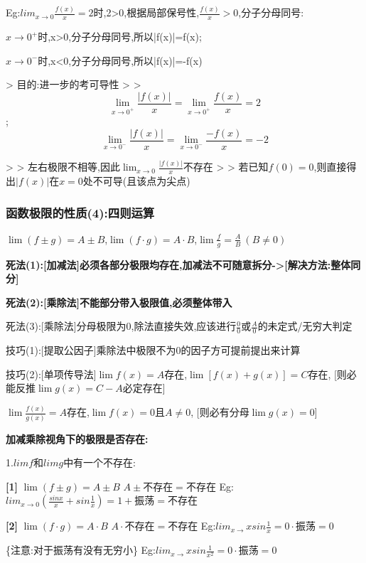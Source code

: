 \documentclass[11pt,a4paper,UTF8]{ctexart}
\begin{document}
\begin{solbox}[{分步推导与答题规范}]
  Eg:$lim_{x\rightarrow 0}\frac{f(x)}{x}=2$时,2>0,根据局部保号性,$\frac{f(x)}{x}>0$,分子分母同号:

  $x\rightarrow 0^+$时,x>0,分子分母同号,所以|f(x)|=f(x);

  $x\rightarrow 0^-$时,x<0,分子分母同号,所以|f(x)|=-f(x)

  >   目的:进一步的考可导性
  >
  >   
\begin{equation*}
\lim_{x \to 0^+} \frac{\vert{}f(x)\vert{}}{x} = \lim_{x \to 0^+} \frac{f(x)}{x} = 2
\end{equation*}
;
\begin{equation*}
\lim_{x \to 0^-} \frac{\vert{}f(x)\vert{}}{x} = \lim_{x \to 0^-} \frac{-f(x)}{x} = -2
\end{equation*}

  >
  >   左右极限不相等,因此$\lim_{x \to 0} \frac{\vert{}f(x)\vert{}}{x}$不存在
  >
  >   若已知$f(0)=0$,则直接得出$\vert{}f(x)\vert{}$在$x=0$处不可导(且该点为尖点)
\end{solbox}


\subsubsection{函数极限的性质(4):四则运算}

$\lim(f \pm g) = A \pm B$,$\lim(f \cdot g) = A \cdot B$,$\lim\frac{f}{g} = \frac{A}{B}\ (B \ne 0)$

\textbf{死法(1):[加减法]必须各部分极限均存在,加减法不可随意拆分->[解决方法:整体同分]}

\textbf{死法(2):[乘除法]不能部分带入极限值,必须整体带入}

\textit{}死法(3):[乘除法]分母极限为0,除法直接失效,应该进行$\frac{0}{0}$或$\frac{A}{0}$的未定式/无穷大判定\textit{}

技巧(1):[提取公因子]乘除法中极限不为0的因子方可提前提出来计算

技巧(2):[单项传导法]$\lim f(x) = A$存在,$\lim [f(x) + g(x)] = C$存在,	 [则必能反推$\lim g(x) = C - A$必定存在]

		$\lim \frac{f(x)}{g(x)} = A$存在,$\lim f(x) = 0$且$A \neq 0$,    	[则必有分母$\lim g(x) = 0$]

\textbf{加减乘除视角下的极限是否存在:}

1.$limf$和$limg$中有一个不存在:

\begin{solbox}[{分步推导与答题规范}]
\textbf{[1]} $\lim(f \pm g) = A \pm B$ $A\pm \text{不存在}=\text{不存在}$	Eg:$lim_{x\rightarrow 0}(\frac{sinx}{x}+sin\frac{1}{x})=1+\text{振荡}=\text{不存在}$

\textbf{[2]} $\lim(f \cdot g) = A \cdot B$	$A\cdot \text{不存在}=\text{不存在}$      Eg:$lim_{x\rightarrow}xsin\frac{1}{x}=0\cdot \text{振荡}=0$

   \{注意:对于振荡有没有无穷小\}	               Eg:$lim_{x\rightarrow}xsin\frac{1}{x^2}=0\cdot \text{振荡}=0$
\end{solbox}
\end{document}
